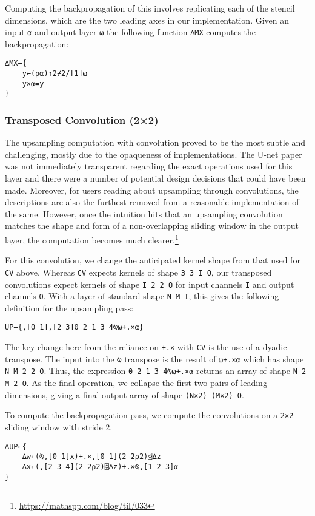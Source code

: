 \documentclass[10pt,twocolumn,english,format=sigplan,screen,balance]{acmart}
\begin{document}
Computing the backpropagation of this involves replicating each of
the stencil dimensions, which are the two leading axes in our implementation.
Given an input \texttt{⍺} and output layer \texttt{⍵} the following
function \texttt{∆MX} computes the backpropagation:
\begin{verbatim}
∆MX←{
    y←(⍴⍺)↑2⌿2/[1]⍵
    y×⍺=y
}
\end{verbatim}

\subsubsection{Transposed Convolution (2×2)}

The upsampling computation with convolution proved to be the most
subtle and challenging, mostly due to the opaqueness of implementations.
The U-net paper was not immediately transparent regarding the exact
operations used for this layer and there were a number of potential
design decisions that could have been made. Moreover, for users reading
about upsampling through convolutions, the descriptions are also the
furthest removed from a reasonable implementation of the same. However,
once the intuition hits that an upsampling convolution matches the
shape and form of a non-overlapping sliding window in the output layer,
the computation becomes much clearer.\footnote{\href{https://mathspp.com/blog/til/033}{https://mathspp.com/blog/til/033}}

For this convolution, we change the anticipated kernel shape from
that used for \texttt{CV} above. Whereas \texttt{CV} expects kernels
of shape \texttt{3 3 I O}, our transposed convolutions expect kernels
of shape \texttt{I 2 2 O} for input channels \texttt{I} and output
channels \texttt{O}. With a layer of standard shape \texttt{N M I},
this gives the following definition for the upsampling pass:
\begin{verbatim}
UP←{,[0 1],[2 3]0 2 1 3 4⍉⍵+.×⍺}
\end{verbatim}
The key change here from the reliance on \texttt{+.×} with \texttt{CV}
is the use of a dyadic transpose. The input into the \texttt{⍉} transpose
is the result of \texttt{⍵+.×⍺} which has shape \texttt{N M 2 2 O}.
Thus, the expression \texttt{0 2 1 3 4⍉⍵+.×⍺} returns an array of
shape \texttt{N 2 M 2 O}. As the final operation, we collapse the
first two pairs of leading dimensions, giving a final output array
of shape \texttt{(N×2) (M×2) O}. 

To compute the backpropagation pass, we compute the convolutions on
a \texttt{2×2} sliding window with stride 2.
\begin{verbatim}
∆UP←{
    ∆w←(⍉,[0 1]x)+.×,[0 1](2 2⍴2)⌺∆z
    ∆x←(,[2 3 4](2 2⍴2)⌺∆z)+.×⍉,[1 2 3]⍺
}
\end{verbatim}
\end{document}
